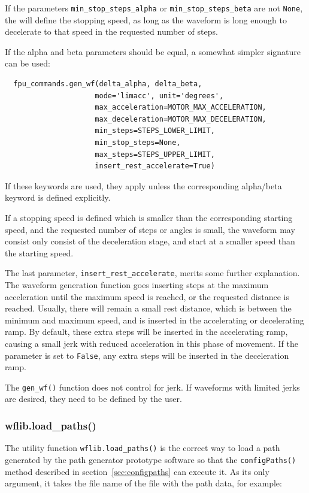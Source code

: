 \documentclass[11pt,a4paper]{scrartcl}
\begin{document}
If the parameters \texttt{min\_stop\_steps\_alpha} or
\texttt{min\_stop\_steps\_beta} are not \texttt{None}, the will define
the stopping speed, as long as the waveform is long enough to
decelerate to that speed in the requested number of steps.

If the alpha and beta parameters should be equal, a somewhat
simpler signature can be used:

\begin{verbatim}
  fpu_commands.gen_wf(delta_alpha, delta_beta,
                     mode='limacc', unit='degrees',
                     max_acceleration=MOTOR_MAX_ACCELERATION,
                     max_deceleration=MOTOR_MAX_DECELERATION,
                     min_steps=STEPS_LOWER_LIMIT,
                     min_stop_steps=None,
                     max_steps=STEPS_UPPER_LIMIT,
                     insert_rest_accelerate=True)
\end{verbatim}

If these keywords are used, they apply unless the corresponding
alpha/beta keyword is defined explicitly.

If a stopping speed is defined which is smaller than the corresponding
starting speed, and the requested number of steps or angles is small,
the waveform may consist only consist of the deceleration stage, and
start at a smaller speed than the starting speed.



The last parameter, \texttt{insert\_rest\_accelerate}, merits some
further explanation. The waveform generation function goes inserting
steps at the maximum acceleration until the maximum speed is reached,
or the requested distance is reached. Usually, there will remain a
small rest distance, which is between the minimum and maximum speed,
and is inserted in the accelerating or decelerating ramp.  By default,
these extra steps will be inserted in the accelerating ramp, causing a
small jerk with reduced acceleration in this phase of movement. If the
parameter is set to \texttt{False}, any extra steps will be inserted in
the deceleration ramp.

The \texttt{gen\_wf()} function does not control for jerk. If
waveforms with limited jerks are desired, they need to be defined by
the user.




\subsubsection{wflib.load\_paths()}
%
%
%
%
The utility function \texttt{wflib.load\_paths()} is the correct way
to load a path generated by the path generator prototype software so
that the \texttt{configPaths()} method described in
section~\ref{sec:configpaths} can execute it. As its only
argument, it takes the file name of the file with the path
data, for example:
\end{document}

